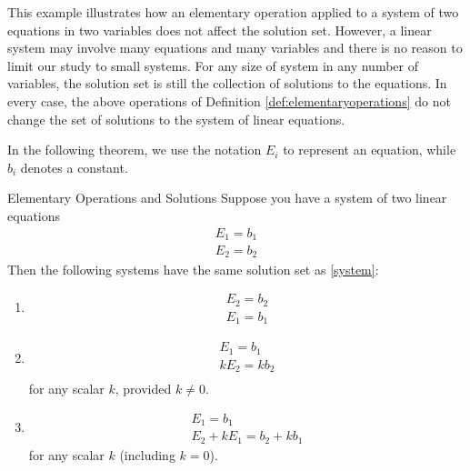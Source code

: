 This example illustrates how an elementary operation applied to a system of two equations in two variables
does not affect the solution set. However, a linear system may involve many equations and many variables and there is no 
reason to limit our study to small systems. For any size of system in any number of variables, the
solution set is still the collection of solutions to the equations. In every
case, the above operations of Definition \ref{def:elementaryoperations} do not
change the set of solutions to the system of linear equations.

In the following theorem, we use the notation $E_i$ to represent an equation, while $b_i$ denotes a
constant. 

\begin{theorem}{Elementary Operations and Solutions}\label{thm:elementaryoperationsandsolns}
Suppose you have a system of two linear equations 
\begin{equation}
 \begin{array}{c}
  E_{1}=b_{1}\\
  E_{2}=b_{2}
\end{array} \label{system}
\end{equation}
Then the following systems have the same solution set as \ref{system}: 
\begin{enumerate}
\item   \begin{equation}
	\begin{array}{c}
	E_{2}=b_{2}\\
	E_{1}=b_{1}
	\end{array}
	\label{thm1.9.1}
	\end{equation}
\item  \begin{equation}
	\begin{array}{c}
	E_{1}=b_{1} \\
	kE_{2}=kb_{2}\\        
	\end{array}
	\label{thm1.9.2}
	\end{equation}
  for any scalar $k$, provided $k\neq0$.
\item \begin{equation}
      \begin{array}{c}
       E_{1}=b_{1} \\
       E_{2}+kE_{1}=b_{2}+kb_{1}
       \end{array}  
	\label{thm1.9.3}
	\end{equation}
	for any scalar  $k$ (including $k=0$).

\end{enumerate}
\end{theorem}

